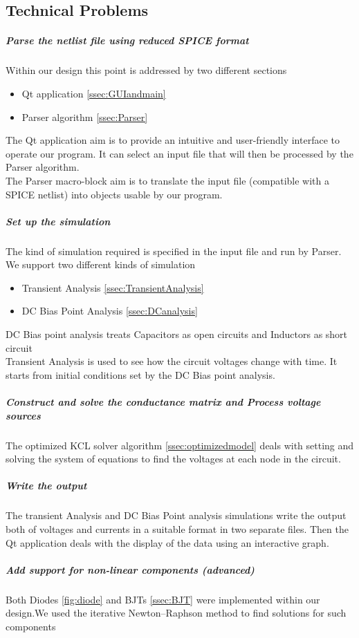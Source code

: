 \documentclass{article}
\begin{document}
\subsection{Technical Problems}
\subparagraph{Parse the netlist file using reduced SPICE format}
Within our design this point is addressed by two different sections
\begin{itemize}
    \item Qt application \ref{ssec:GUIandmain}
    \item Parser algorithm \ref{ssec:Parser}
\end{itemize}
The Qt application aim is to provide an intuitive and user-friendly interface to operate our program. It can select an input file that will then be processed by the Parser algorithm.\\
The Parser macro-block aim is to translate the input file (compatible with a SPICE netlist) into objects usable by our program.\\
\subparagraph{Set up the simulation }
The kind of simulation required is specified in the input file and run by Parser.\\
We support two different kinds of simulation
\begin{itemize}
    \item Transient Analysis \ref{ssec:TransientAnalysis}
    \item DC Bias Point Analysis \ref{ssec:DCanalysis}
\end{itemize}
DC Bias point analysis treats Capacitors as open circuits and Inductors as short circuit\\
Transient Analysis is used to see how the circuit voltages change with time. It starts from initial conditions set by the DC Bias point analysis.
\subparagraph{Construct and solve the conductance matrix and Process voltage sources}
The optimized KCL solver algorithm \ref{ssec:optimizedmodel} deals with setting and solving the system of equations to find the voltages at each node in the circuit.
\subparagraph{Write the output}
The transient Analysis and DC Bias Point analysis simulations write the output both of voltages and currents in a suitable format in two separate files. Then the Qt application deals with the display of the data using an interactive graph.
\subparagraph{ Add support for non-linear components (advanced)}
Both Diodes \ref{fig:diode} and BJTs \ref{ssec:BJT} were implemented within our design.We used the iterative Newton–Raphson method to find solutions for such components\bigbreak


\newpage
\end{document}
